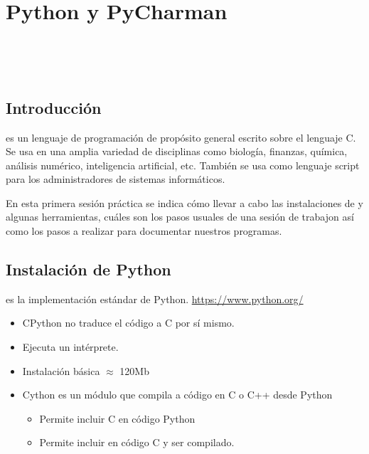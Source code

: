 
\chapter{Python y PyCharman}

\localtableofcontents

\

\


\formatoNormal


\section{Introducción}

 es un lenguaje de programación de propósito general escrito sobre el lenguaje C. Se usa en una amplia variedad de disciplinas como biología, finanzas, química, análisis numérico, inteligencia artificial, etc. También se usa como lenguaje script para los administradores de sistemas informáticos.

En esta primera sesión práctica se indica cómo llevar a cabo las instalaciones de  y algunas herramientas, cuáles son los pasos usuales de una sesión de trabajon así como los pasos a realizar para documentar nuestros programas.


\section{Instalación de Python}


  es la implementación estándar de Python. {\small \url{https://www.python.org/}}
	\begin{itemize}
	\item CPython no traduce el código  a C por sí mismo.  
	\item Ejecuta un intérprete. 
	\item Instalación básica $\approx$ 120Mb
	\item Cython es un módulo que compila a código en C o C++ desde Python
		\begin{itemize}
		\item Permite incluir C en código Python
		\item Permite incluir  en código C y ser compilado.
		\end{itemize}
	\end{itemize}
	

